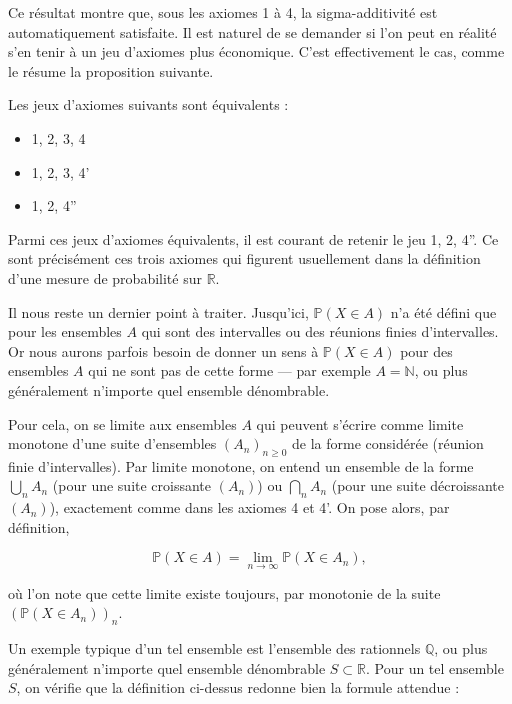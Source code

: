 Ce résultat montre que, sous les axiomes 1 à 4, la sigma-additivité est automatiquement satisfaite. Il est naturel de se demander si l'on peut en réalité s'en tenir à un jeu d'axiomes plus économique. C'est effectivement le cas, comme le résume la proposition suivante.

\medskip

\begin{mdframed}
\begin{definition}
Les jeux d'axiomes suivants sont équivalents :

\begin{itemize}
\item 1, 2, 3, 4
\item 1, 2, 3, 4'
\item 1, 2, 4''
\end{itemize}

Parmi ces jeux d'axiomes équivalents, il est courant de retenir le jeu 1, 2, 4''. Ce sont précisément ces trois axiomes qui figurent usuellement dans la définition d'une mesure de probabilité sur $\mathbb{R}$.
\end{definition}
\end{mdframed}

Il nous reste un dernier point à traiter. Jusqu'ici, $\mathbb{P}(X \in A)$ n'a été défini que pour les ensembles $A$ qui sont des intervalles ou des réunions finies d'intervalles. Or nous aurons parfois besoin de donner un sens à $\mathbb{P}(X \in A)$ pour des ensembles $A$ qui ne sont pas de cette forme — par exemple $A = \mathbb{N}$, ou plus généralement n'importe quel ensemble dénombrable.

Pour cela, on se limite aux ensembles $A$ qui peuvent s'écrire comme limite monotone d'une suite d'ensembles $(A_n)_{n \geq 0}$ de la forme considérée (réunion finie d'intervalles). Par limite monotone, on entend un ensemble de la forme $\bigcup_n A_n$ (pour une suite croissante $(A_n)$) ou $\bigcap_n A_n$ (pour une suite décroissante $(A_n)$), exactement comme dans les axiomes 4 et 4'. On pose alors, par définition,

$$
\mathbb{P}(X \in A) = \lim_{n \to \infty} \mathbb{P}(X \in A_n),
$$

où l'on note que cette limite existe toujours, par monotonie de la suite $\left(\mathbb{P}(X \in A_n)\right)_n$.

Un exemple typique d'un tel ensemble est l'ensemble des rationnels $\mathbb{Q}$, ou plus généralement n'importe quel ensemble dénombrable $S \subset \mathbb{R}$. Pour un tel ensemble $S$, on vérifie que la définition ci-dessus redonne bien la formule attendue :

